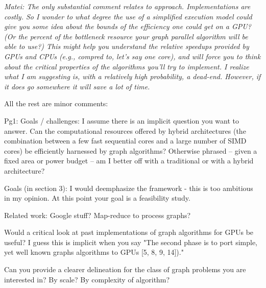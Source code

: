 \documentclass{acm_proc_article-sp}[12pt]
\begin{document}
{\em Matei:  
The only substantial comment relates to approach.  Implementations are costly. So I wonder to what degree the use of a simplified execution model could give you some idea about the bounds of the efficiency one could get on a GPU?   (Or the percent of the bottleneck resource your graph parallel algorithm will be able to use?)  This might help you understand the relative speedups provided by GPUs and CPUs (e.g., compred to, let's say one core), and will force you to think about the critical properties of the algorithms you'll try to implement.   I realize what I am suggesting is, with a relatively high probability, a dead-end.  However, if it does go somewhere it will save a lot of  time.
 
All the rest are minor comments:
 
Pg1: Goals / challenges: I assume there is an implicit question you want to answer.  Can the computational resources offered by hybrid architectures (the combination between a few fast sequential cores and a large number of SIMD cores) be efficiently harnessed by graph algorithms?    Otherwise phrased – given a fixed area or power budget – am I better off with a traditional or with a hybrid architecture?
 
Goals (in section 3): I would deemphasize the framework - this is too ambitious in my opinion.  At this point your goal is a feasibility study.
 
Related work: Google stuff? Map-reduce to process graphs?
 
Would a critical look at past implementations of graph algorithms for GPUs be useful?  I guess this is implicit when you say "The second phase is to port simple, yet well known graphs algorithms to GPUs [5, 8, 9, 14])."
 
Can you provide a clearer delineation for the class of graph problems you are interested in?  By scale? By complexity of algorithm?
}



\end{document}
